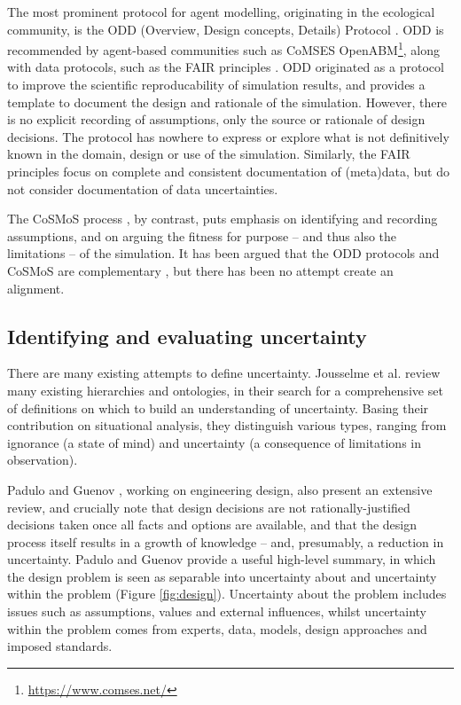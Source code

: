 \documentclass[sigconf,authordraft]{acmart}
\begin{document}
The most prominent protocol for agent modelling, originating in the ecological community, is the ODD (Overview, Design concepts, Details) Protocol \cite{ODD2006,ODD-2020}.  ODD is recommended by agent-based communities such as CoMSES OpenABM\footnote{\url{https://www.comses.net/}}, along with data protocols, such as the FAIR principles \cite{FAIR2016}.  ODD originated as a protocol to improve the scientific reproducability of simulation results, and provides a template to document the design and rationale of the simulation.  However, there is no explicit recording of assumptions, only the source or rationale of design decisions.  The protocol has nowhere to express or explore what is not definitively known in the domain, design or use of the simulation.  Similarly, the FAIR principles focus on complete and consistent documentation of (meta)data, but do not consider documentation of data uncertainties.   

The CoSMoS process \cite{cosmosBook}, by contrast, puts emphasis on identifying and recording assumptions, and on arguing the fitness for purpose -- and thus also the limitations -- of the simulation.  It has been argued that the ODD protocols and CoSMoS are complementary \cite{cosmos-odd}, but there has been no attempt create an alignment.


\subsection{Identifying and evaluating uncertainty} 

There are many existing attempts to define uncertainty.  Jousselme et al. \cite{unc-sap} review many existing hierarchies and ontologies, in their search for a comprehensive set of definitions on which to build an understanding of uncertainty.  Basing their contribution on situational analysis, they distinguish various types, ranging from ignorance (a state of mind) and uncertainty (a consequence of limitations in observation).  

Padulo and Guenov \cite{unc-ced}, working on engineering design, also present an extensive review, and crucially  note that design decisions are not rationally-justified decisions taken once all facts and options are available, and that the design process itself results in a growth of knowledge -- and, presumably, a reduction in uncertainty.  Padulo and Guenov provide a useful high-level summary, in which the design problem is seen as separable into uncertainty about and uncertainty within the problem (Figure \ref{fig:design}).  Uncertainty about the problem includes issues such as assumptions, values and external influences, whilst uncertainty within the problem comes from experts, data, models, design approaches and imposed standards.
\end{document}
